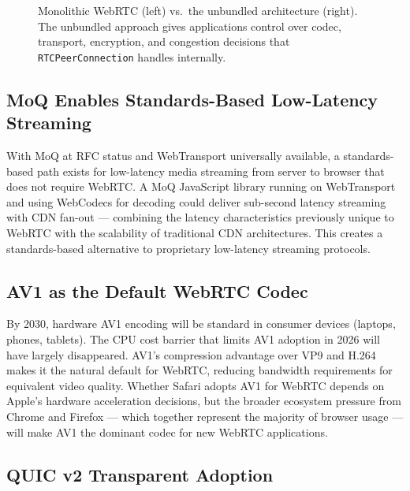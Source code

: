 \documentclass[11pt]{article}
\begin{document}
\begin{figure}[ht]
\caption{Monolithic WebRTC (left) vs.\ the unbundled architecture (right).
  The unbundled approach gives applications control over codec, transport,
  encryption, and congestion decisions that \texttt{RTCPeerConnection}
  handles internally.}
\label{fig:unbundled}
\end{figure}

\subsection{MoQ Enables Standards-Based Low-Latency Streaming}

With MoQ at RFC status and WebTransport universally available, a
standards-based path exists for low-latency media streaming from server to
browser that does not require WebRTC. A MoQ JavaScript library running on
WebTransport and using WebCodecs for decoding could deliver sub-second
latency streaming with CDN fan-out --- combining the latency characteristics
previously unique to WebRTC with the scalability of traditional CDN
architectures. This creates a standards-based alternative to proprietary
low-latency streaming protocols.

\subsection{AV1 as the Default WebRTC Codec}

By 2030, hardware AV1 encoding will be standard in consumer devices
(laptops, phones, tablets). The CPU cost barrier that limits AV1 adoption in
2026 will have largely disappeared. AV1's compression advantage over VP9 and
H.264 makes it the natural default for WebRTC, reducing bandwidth
requirements for equivalent video quality. Whether Safari adopts AV1 for
WebRTC depends on Apple's hardware acceleration decisions, but the broader
ecosystem pressure from Chrome and Firefox --- which together represent the
majority of browser usage --- will make AV1 the dominant codec for new
WebRTC applications.

\subsection{QUIC v2 Transparent Adoption}
\end{document}
